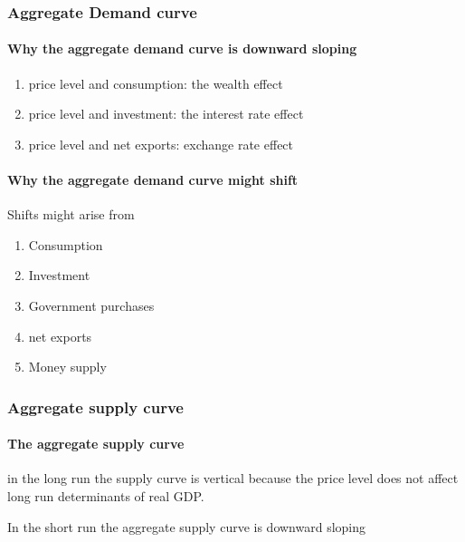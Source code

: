 \documentclass[a4paper,titlepage] {scrartcl}
\begin{document}
\subsubsection{Aggregate Demand curve}
\paragraph{Why the aggregate demand curve is downward sloping} %
\label{par:why_the_aggregate_demand_curve_is_downward_sloping}
\begin{enumerate}
	\item price level and consumption: the wealth effect
	\item price level and investment: the interest rate effect
	\item price level and net exports: exchange rate effect
\end{enumerate}

\paragraph{Why the aggregate demand curve might shift} %
\label{par:why_the_aggregate_demand_curve_might_shift}
Shifts might arise from
\begin{enumerate}
	\item Consumption
	\item Investment	
	\item Government purchases
	\item net exports
	\item Money supply
\end{enumerate}




\subsubsection{Aggregate supply curve}

\paragraph{The aggregate supply curve} %
\label{par:the_aggregate_supply_curve}
in the long run the supply curve is vertical because the price level does not affect long run determinants of real GDP.

In the short run the aggregate supply curve is downward sloping
\end{document}
